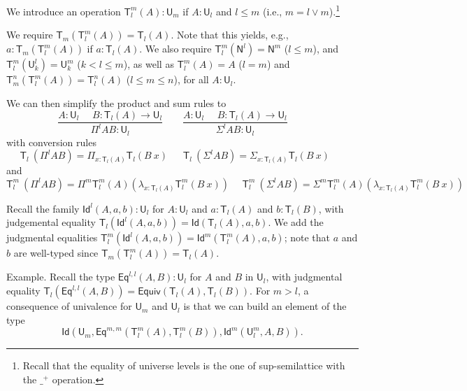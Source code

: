 \documentclass[11pt,a4paper]{article}
\theoremstyle{definition}
\newcommand{\Id}{\mathsf{Id}}
\newcommand{\Eq}{\mathsf{Eq}}
\newcommand{\NN}{\mathsf{N}}
\newcommand{\UU}{\mathsf{U}}
\newcommand{\mylam}[3]{\lambda_{#1:#2}#3}
\newcommand{\mypi}[3]{\Pi_{#1:#2}#3}
\newcommand{\mysig}[3]{\Sigma_{#1:#2}#3}
\newcommand{\T}{\mathsf{T}}
\newcommand{\Equiv}{\mathsf{Equiv}}
\begin{document}


We introduce an operation $\T_{l}^{m}(A):\UU_{m}$ if $A:\UU_{l}$
and $l\leqslant m$ (i.e., $m = l\vee m$).\footnote{%
Recall that the equality of universe levels is the one of
sup-semilattice with the $\_^+$ operation.}

We require $\T_{m}(\T_{l}^{m}(A)) = \T_{l}(A)$. Note that this
yields, e.g., $a:\T_{m}(\T_{l}^{m}(A))$ if $a:\T_{l}(A)$.
We also require $\T_{l}^{m}(\NN^{l}) = \NN^{m}$ ($l\leqslant m$),
and $\T_{l}^{m}(\UU_{k}^l) = \UU_{k}^{m}$ ($k<l\leqslant m$),
as well as $\T_{l}^m(A) = A$ ($l=m$)
and $\T_{m}^n(\T_{l}^m(A)) = \T_l^n(A)$ ($l\leqslant m\leqslant n$),
for all $A:\UU_l$.

We can then simplify the product and sum rules to
$$
\frac{A:\UU_{l}~~~~~~B:\T_{l}(A)\rightarrow \UU_{l}}
     {\Pi^{l} A B:\UU_{l}}~~~~~~~~~
\frac{A:\UU_{l}~~~~~~B:\T_{l}(A)\rightarrow \UU_{l}}
     {\Sigma^{l} A B:\UU_{l}}~~~~~~~~~
$$
with conversion rules
$$
\T_{l}~(\Pi^{l} A B) = \mypi{x}{\T_{l}(A)}{ \T_{l}(B~x)}~~~~~~~
\T_{l}~(\Sigma^{l} A B) =  \mysig{x}{\T_{l}(A)}{ \T_{l}(B~x)}~~~~~~~
$$
and
$$
\T_{l}^{m}~(\Pi^{l} A B) = \Pi^{m} \T_{l}^{m}(A) (\mylam {x}{\T_{l}(A)}{\T_{l}^{m}(B~x)})~~~~~~
\T_{l}^{m}~(\Sigma^{l} A B) = \Sigma^{m} \T_{l}^{m}(A) (\mylam {x}{\T_{l}(A)}{\T_{l}^{m}(B~x)})~~~~~~
$$

Recall the family $\Id^l(A,a,b):\UU_l$ for $A:\UU_l$
and $a:\T_l(A)$ and $b:\T_l(B)$, with
judgemental equality $\T_l(\Id^l(A,a,b)) = \Id(\T_l(A),a,b)$.
We add the judgmental equalities $\T_l^m(\Id^l(A,a,b)) =
\Id^m(\T_l^m(A),a,b)$; note that $a$ and $b$ are well-typed since
$\T_{m}(\T_{l}^{m}(A)) = \T_{l}(A)$.

\medskip

Example. Recall the type $\Eq^{l,l}(A,B):\UU_l$ for $A$ and $B$ in $\UU_l$,
with judgmental equality
$\T_l(\Eq^{l,l}(A,B)) = \Equiv(\T_l(A),\T_l(B))$.
For $m>l$, a consequence of univalence
for $\UU_m$ and $\UU_l$ is that we can build an element of the type
$$
\Id(\UU_m,\Eq^{m,m}(\T^m_l(A),\T^m_l(B)),\Id^m(\UU^m_l,A,B)).
$$
\end{document}
